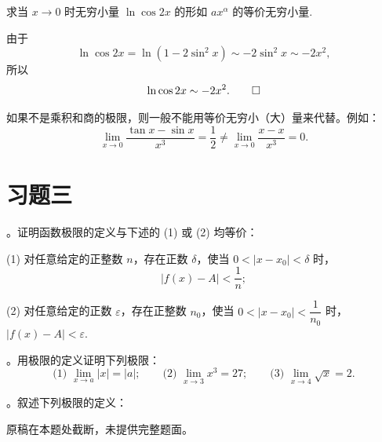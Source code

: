 \begin{example}\label{example:ma-3-4-7}
求当 $x\to0$ 时无穷小量 $\ln\cos 2x$ 的形如 $ax^\alpha$ 的等价无穷小量.
\end{example}


\begin{solve}
由于
\[
  \ln\cos 2x
  =
  \ln(1-2\sin^2x)
  \sim
  -2\sin^2x
  \sim
  -2x^2,
\]
所以
\[
  \ln\cos 2x\sim -2x^2.
\qedhere
\]
\end{solve}


\begin{remark}\label{remark:ma-3-source-139}
如果不是乘积和商的极限，则一般不能用等价无穷小（大）量来代替。例如：
\[
  \lim_{x\to0}\frac{\tan x-\sin x}{x^3}
  =
  \frac12
  \ne
  \lim_{x\to0}\frac{x-x}{x^3}
  =
  0.
\]
\end{remark}


\section*{习题三}
{}
\label{exercises:ma-3}

。证明函数极限的定义与下述的 (1) 或 (2) 均等价：

(1) 对任意给定的正整数 $n$，存在正数 $\delta$，使当 $0<|x-x_0|<\delta$ 时，
\[
  |f(x)-A|<\frac1n;
\]

(2) 对任意给定的正数 $\varepsilon$，存在正整数 $n_0$，使当 $0<|x-x_0|<\dfrac1{n_0}$ 时，$|f(x)-A|<\varepsilon$.

。用极限的定义证明下列极限：
\[
  \text{(1) }\lim_{x\to a}|x|=|a|;\qquad
  \text{(2) }\lim_{x\to3}x^3=27;\qquad
  \text{(3) }\lim_{x\to4}\sqrt{x}=2.
\]

。叙述下列极限的定义：

\begin{remark}
原稿在本题处截断，未提供完整题面。
\end{remark}

